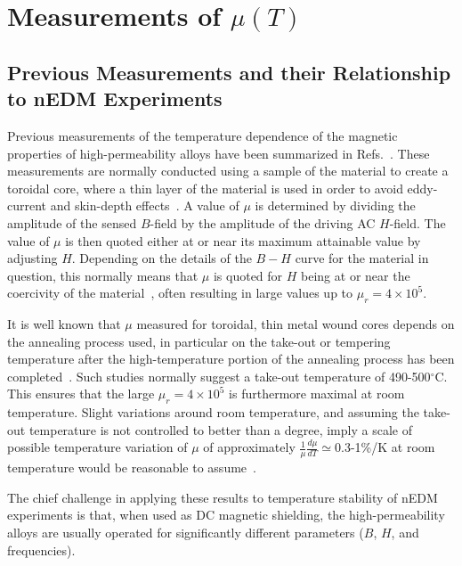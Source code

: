 \documentclass[review]{elsarticle}
\begin{document}





\section{Measurements of $\mu(T)$}

\subsection{Previous Measurements and their Relationship to nEDM Experiments\label{sec:previousmeasurement}}

Previous measurements of the temperature dependence of the magnetic
properties of high-permeability alloys have been summarized in
Refs.~\cite{bib:pfeifer,bib:bozorth,bib:couderchon}.  These
measurements are normally conducted using a sample of the material to
create a toroidal core, where a thin layer of the material is used in
order to avoid eddy-current and skin-depth
effects~\cite{bib:pfeifer,bib:kruppvdm}.  A value of $\mu$ is
determined by dividing the amplitude of the sensed $B$-field by the
amplitude of the driving AC $H$-field.  The value of $\mu$ is then
quoted either at or near its maximum attainable value by adjusting
$H$.  Depending on the details of the $B-H$ curve for the material in
question, this normally means that $\mu$ is quoted for $H$ being at or
near the coercivity of the
material~\cite{bib:couderchon,bib:kruppvdm}, often resulting in large
values up to $\mu_r=4\times 10^5$.

It is well known that $\mu$ measured for toroidal, thin metal wound
cores depends on the annealing process used, in particular on the
take-out or tempering temperature after the high-temperature portion
of the annealing process has been
completed~\cite{bib:pfeifer,bib:kruppvdm,bib:couderchon}.  Such
studies normally suggest a take-out temperature of 490-500$^\circ$C.
This ensures that the large $\mu_r=4\times 10^{5}$ is furthermore
maximal at room temperature.  Slight variations around room
temperature, and assuming the take-out temperature is not controlled
to better than a degree, imply a scale of possible temperature
variation of $\mu$ of approximately
$\frac{1}{\mu}\frac{d\mu}{dT}\simeq$0.3-1\%/K at room temperature would be
reasonable to assume~\cite{bib:couderchon,bib:kruppvdm}.

The chief challenge in applying these results to temperature stability
of nEDM experiments is that, when used as DC magnetic shielding, the
high-permeability alloys are usually operated for significantly
different parameters ($B$, $H$, and frequencies).
\end{document}
